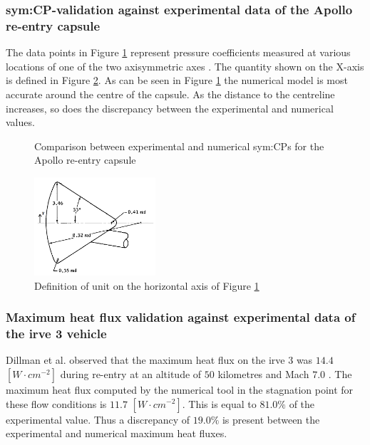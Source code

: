 \subsubsection{\acrshort{sym:CP}-validation against experimental data of the Apollo re-entry capsule}
\label{subsubsec:Apollo_validation}
The data points in Figure \ref{fig:Apollo_cp} represent pressure coefficients measured at various locations of one of the two axisymmetric axes \cite{Bertin1966}. The quantity shown on the X-axis is defined in Figure \ref{fig:Apollo_y}. As can be seen in Figure \ref{fig:Apollo_cp} the numerical model is most accurate around the centre of the capsule. As the distance to the centreline increases, so does the discrepancy between the experimental and numerical values.

\begin{figure}[ht]
	\centering
	\setlength{} 
	\setlength{}
	
	\caption{Comparison between experimental and numerical \glspl{sym:CP} for the Apollo re-entry capsule}
	\label{fig:Apollo_cp}
\end{figure}

\begin{figure}[ht]
	\centering
	\includegraphics[width=0.4\textwidth]{./Figure/Aerodynamics/Apollo_model}
	\caption[Definition of unit on the horizontal axis of Figure \ref{fig:Apollo_cp}]{Definition of unit on the horizontal axis of Figure \ref{fig:Apollo_cp} \cite{Bertin1966}}
	\label{fig:Apollo_y}
\end{figure}

\subsubsection{Maximum heat flux validation against experimental data of the \gls{irve} 3 vehicle}
\label{subsubsec:heatvalidation}
Dillman et al. observed that the maximum heat flux on the \acrfull{irve} 3 was $14.4$ $[W\cdot cm^{-2}]$ during re-entry at an altitude of $50$ kilometres and Mach $7.0$ \cite{Dillman2012}. The maximum heat flux computed by the numerical tool in the stagnation point for these flow conditions is $11.7$ $[W\cdot cm^{-2}]$. This is equal to $81.0\%$ of the experimental value. Thus a discrepancy of $19.0\%$ is present between the experimental and numerical maximum heat fluxes.


